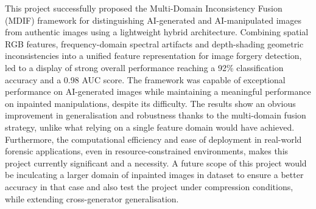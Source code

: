 
This project successfully proposed the Multi-Domain Inconsistency Fusion (MDIF)
framework for distinguishing AI-generated and AI-manipulated images from
authentic images using a lightweight hybrid architecture. Combining spatial RGB
features, frequency-domain spectral artifacts and depth-shading geometric
inconsistencies into a unified feature representation for image forgery
detection, led to a display of strong overall performance reaching a 92\%
classification accuracy and a 0.98 AUC score. The framework was capable of
exceptional performance on AI-generated images while maintaining a meaningful
performance on inpainted manipulations, despite its difficulty. The results show
an obvious improvement in generalisation and robustness thanks to the
multi-domain fusion strategy, unlike what relying on a single feature domain
would have achieved. Furthermore, the computational efficiency and ease of
deployment in real-world forensic applications, even in resource-constrained
environments, makes this project currently significant and a necessity. A future
scope of this project would be inculcating a larger domain of inpainted images
in dataset to ensure a better accuracy in that case and also test the project
under compression conditions, while extending cross-generator generalisation.
